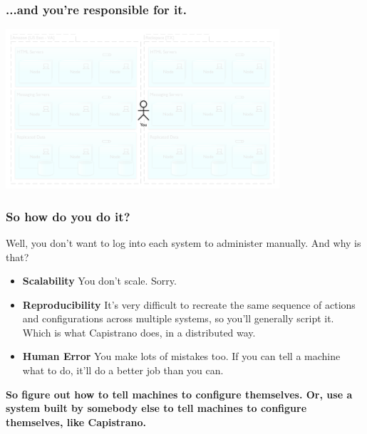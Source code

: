 \documentclass[t,handout]{beamer}
\begin{document}
\begin{frame}
\frametitle{...and you're responsible for it.}
\begin{center}
\includegraphics[width = 4in]{cap-distributed-you.pdf}
\end{center}
\transfade
\end{frame}

\begin{frame}
\frametitle{So how do you do it?}
Well, you don't want to log into each system to administer manually.  And why is that?
\begin{small}
\begin{itemize}
\item {\bf Scalability} You don't scale.  Sorry.
\item {\bf Reproducibility}  It's very difficult to recreate the same sequence of actions and configurations across multiple systems, so you'll generally script it.  Which is what Capistrano does, in a distributed way.
\item {\bf Human Error} You make lots of mistakes too.  If you can tell a machine what to do, it'll do a better job than you can.
\end{itemize}
\end{small}
\begin{center}
{\bf So figure out how to tell machines to configure themselves.  Or, use a system built by somebody else to tell machines to configure themselves, like Capistrano.}
\end{center}
\end{frame}
\end{document}
